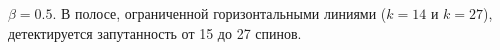 $\beta=0.5$.
В полосе, ограниченной горизонтальными линиями ($k=14$ и $k=27$),
детектируется запутанность от 15 до 27 спинов.